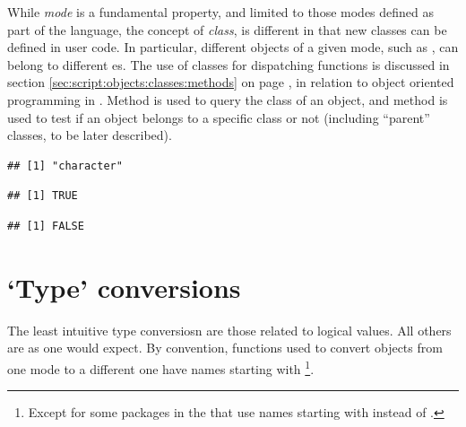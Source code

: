 \documentclass[krantz2]{krantz}\usepackage{knitr}%
\begin{document}
While \emph{mode} is a fundamental property, and limited to those modes defined as part of the \Rlang language, the concept of \emph{class}, is different in that new classes can be defined in user code. In particular, different \Rlang objects of a given mode, such as , can belong to different es. The use of classes for dispatching functions is discussed in section \ref{sec:script:objects:classes:methods} on page \pageref{sec:script:objects:classes:methods}, in relation to object oriented programming in \Rlang. Method  is used to query the class of an object, and method  is used to test if an object belongs to a specific class or not (including ``parent'' classes, to be later described).

\begin{knitrout}\footnotesize
{}\color{fgcolor}\begin{kframe}
\begin{alltt}
\end{alltt}
\begin{verbatim}
## [1] "character"
\end{verbatim}
\begin{alltt}
 \hlstd{)}
\end{alltt}
\begin{verbatim}
## [1] TRUE
\end{verbatim}
\begin{alltt}
 \hlstd{)}
\end{alltt}
\begin{verbatim}
## [1] FALSE
\end{verbatim}
\end{kframe}
\end{knitrout}

\section{`Type' conversions}\label{sec:calc:type:conversion}
The least intuitive type conversiosn are those related to logical values. All others are as one would expect. By convention, functions used to convert objects from one mode to a different one have names starting with \footnote{Except for some packages in the  that use names starting with  instead of .}.
\end{document}
